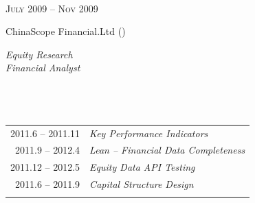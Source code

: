 \documentclass[10pt]{article} %
\begin{document}
\begin{minipage}[t]{0.5\textwidth}
\normalsize{}\\[2pt]


{\raggedleft\textsc{\rm July 2009 -- Nov 2009}\par}

\raggedright{\large\rm ChinaScope Financial.Ltd ()}\\
\raggedright{\textit{Equity Research \\Financial Analyst}\\[5pt]}

\normalsize{}\\[10pt]



\section{} 

\begin{tabular}{rl}
2011.6 -- 2011.11&\textsl{Key Performance Indicators}\\[2pt]
2011.9 -- 2012.4&\textsl{Lean -- Financial Data Completeness}\\[2pt]
2011.12 -- 2012.5&\textsl{Equity Data API Testing}\\[2pt]
2011.6 -- 2011.9&\textsl{Capital Structure Design}\\[2pt]
&\\

\end{tabular}\\

\end{minipage} %
\end{document}
